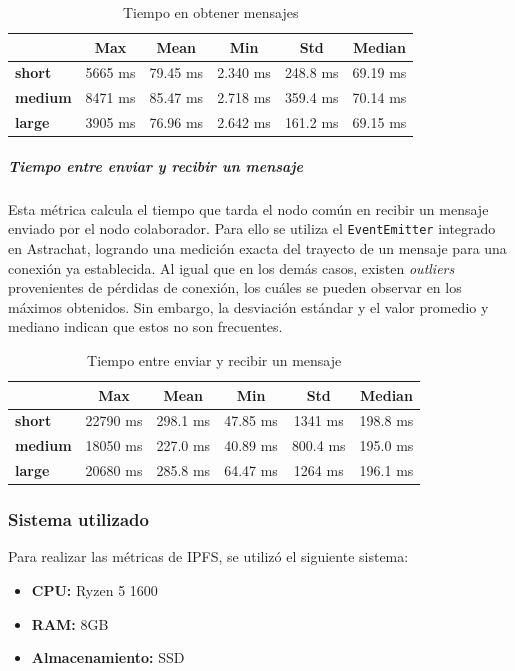 \setlength\tabcolsep{10pt}
\begin{table}[H]
    \centering
    \begin{tabular}{|l|c|c|c|c|c|}
        \hline
        & \textbf{Max} & \textbf{Mean} & \textbf{Min} & \textbf{Std} & \textbf{Median} \\ \hline
        \textbf{short} & 5665 ms & 79.45 ms & 2.340 ms & 248.8 ms & 69.19 ms \\ \hline
        \textbf{medium} & 8471 ms & 85.47 ms & 2.718 ms & 359.4 ms & 70.14 ms \\ \hline
        \textbf{large} & 3905 ms & 76.96 ms & 2.642 ms & 161.2 ms & 69.15 ms \\ \hline
    \end{tabular}
    \caption{Tiempo en obtener mensajes}
\end{table}  

\subparagraph{Tiempo entre enviar y recibir un mensaje}

Esta métrica calcula el tiempo que tarda el nodo común en recibir un mensaje enviado por el nodo colaborador. Para ello se utiliza el \texttt{EventEmitter} integrado en Astrachat, logrando una medición exacta del trayecto de un mensaje para una conexión ya establecida. Al igual que en los demás casos, existen \textit{outliers} provenientes de pérdidas de conexión, los cuáles se pueden observar en los máximos obtenidos. Sin embargo, la desviación estándar y el valor promedio y mediano indican que estos no son frecuentes.

\setlength\tabcolsep{10pt}
\begin{table}[!htbp]
    \centering
    \begin{tabular}{|l|c|c|c|c|c|}
        \hline
        & \textbf{Max} & \textbf{Mean} & \textbf{Min} & \textbf{Std} & \textbf{Median} \\ \hline
        \textbf{short} & 22790 ms & 298.1 ms & 47.85 ms & 1341 ms & 198.8 ms \\ \hline
        \textbf{medium} & 18050 ms & 227.0 ms & 40.89 ms & 800.4 ms & 195.0 ms \\ \hline
        \textbf{large} & 20680 ms & 285.8 ms & 64.47 ms & 1264 ms & 196.1 ms \\ \hline
    \end{tabular}
    \caption{Tiempo entre enviar y recibir un mensaje}
\end{table}  

\subsubsection{Sistema utilizado}

Para realizar las métricas de IPFS, se utilizó el siguiente sistema:
\begin{itemize}
    \item \textbf{CPU:} Ryzen 5 1600
    \item \textbf{RAM:} 8GB
    \item \textbf{Almacenamiento:} SSD
\end{itemize}